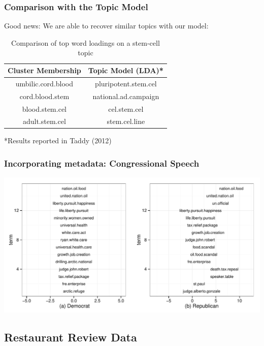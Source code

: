 \documentclass[handout]{beamer}
\begin{document}
\begin{frame}
\frametitle{Comparison with the Topic Model}
Good news: We are able to recover similar topics with our model:
\begin{table}[!htbp]
\caption{Comparison of top word loadings on a stem-cell topic} \label{tab:title}
\centering
\begin{tabular}{  c  c }
Cluster Membership & Topic Model (LDA)* \\
\hline
umbilic.cord.blood & pluripotent.stem.cel \\
cord.blood.stem  & national.ad.campaign \\
blood.stem.cel   & cel.stem.cel \\
adult.stem.cel & stem.cel.line \\
\end{tabular}
\end{table}
*Results reported in Taddy (2012)
\end{frame}

\begin{frame}
\frametitle{Incorporating metadata: Congressional Speech} %
\begin{center}
\includegraphics[width=1.1\textwidth]{Images/Blei_Changing_Loadings_GOP.pdf}
\end{center}
\end{frame}

\subsection{Restaurant Review Data}
\end{document}
